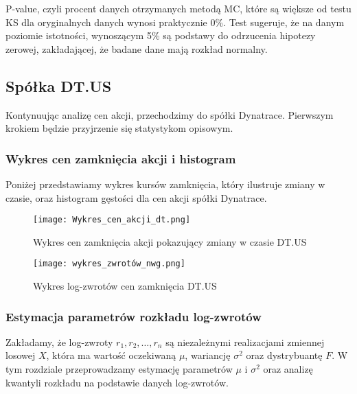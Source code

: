 \documentclass[a4paper,11pt]{article}
\begin{document}
P-value, czyli procent danych otrzymanych metodą MC, które są większe od testu KS dla oryginalnych danych wynosi praktycznie 0\%. Test sugeruje, że na danym poziomie istotności, wynoszącym 5\% są podstawy do odrzucenia hipotezy zerowej, zakładającej, że badane dane mają rozkład normalny.









\subsection{Spółka DT.US}
Kontynuując analizę cen akcji, przechodzimy do spółki Dynatrace. Pierwszym krokiem będzie przyjrzenie się statystykom opisowym.

\subsubsection{Wykres cen zamknięcia akcji i histogram}
Poniżej przedstawiamy wykres kursów zamknięcia, który ilustruje zmiany w czasie, oraz histogram gęstości dla cen akcji spółki Dynatrace.

\begin{figure}[h]
\centering
\begin{minipage}[b]{0.40\textwidth}
\centering
\texttt{[image: Wykres\_cen\_akcji\_dt.png]}
\caption{Wykres cen zamknięcia akcji pokazujący zmiany w czasie DT.US}
\label{fig:r3}
\end{minipage}
\hfill
\begin{minipage}[b]{0.40\textwidth}
\centering
\texttt{[image: wykres\_zwrotów\_nwg.png]}
\caption{Wykres log-zwrotów cen zamknięcia DT.US}
\label{fig:r4}
\end{minipage}
\end{figure}


\subsubsection{Estymacja parametrów rozkładu log-zwrotów}

Zakładamy, że log-zwroty \(r_1, r_2, \ldots, r_n\) są niezależnymi realizacjami zmiennej losowej \(X\), która ma wartość oczekiwaną \(\mu\), wariancję \(\sigma^2\) oraz dystrybuantę \(F\). W tym rozdziale przeprowadzamy estymację parametrów \(\mu\) i \(\sigma^2\) oraz analizę kwantyli rozkładu na podstawie danych log-zwrotów.
\end{document}
